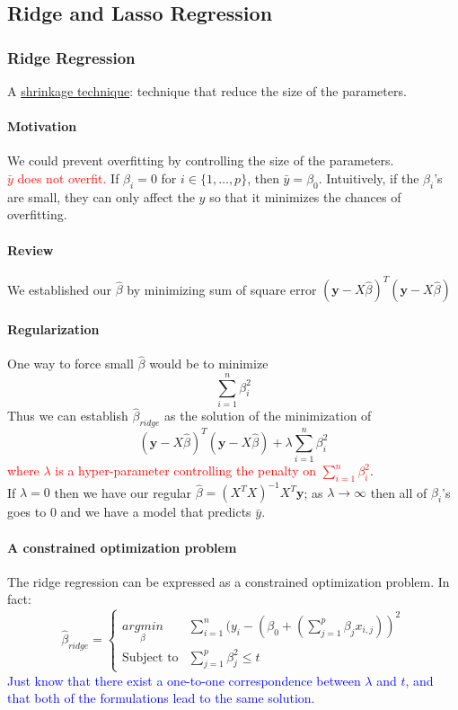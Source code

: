 \documentclass[11pt]{article}
\newcommand{\tb}[1]{\textbf{#1}}
\newcommand{\under}[1]{\underline{#1}}
\newcommand{\vy}[0]{\tb{y}}
\begin{document}
\subsection{Ridge and Lasso Regression}
\subsubsection{Ridge Regression}
A \under{shrinkage technique}: technique that reduce the size of the parameters.
\paragraph{Motivation}
We could prevent overfitting by controlling the size of the parameters.\\
\textcolor{red}{$\bar{y}$ does not overfit.} If $\beta_i = 0$ for $i \in \{1, \hdots, p\}$, then $\bar{y} = \beta_0$. Intuitively, if the $\beta_i$'s are small, they can only affect the $y$ so that it minimizes the chances of overfitting.
\paragraph{Review}
We established our $\hat{\beta}$ by minimizing sum of square error $(\vy - X\hat{\beta})^T(\vy - X\hat{\beta})$
\paragraph{Regularization}
One way to force small $\hat{\beta}$ would be to minimize $$\sum_{i=1}^n \beta_i^2$$
Thus we can establish $\hat{\beta}_{ridge}$ as the solution of the minimization of 
$$(\vy - X\hat{\beta})^T(\vy - X \hat{\beta}) + \lambda \sum_{i=1}^n \beta_i^2$$ 
\textcolor{red}{where $\lambda$ is a hyper-parameter controlling the penalty on $\sum_{i=1}^n \beta_i^2$}. \\
If $\lambda = 0$ then we have our regular $\hat{\beta} = (X^TX)^{-1}X^T\vy$; as $\lambda \rightarrow \infty$ then all of $\beta_i$'s goes to 0 and we have a model that predicts $\bar{y}$.
\paragraph{A constrained optimization problem}
The ridge regression can be expressed as a constrained optimization problem. In fact:
$$\hat{\beta}_{ridge} = \begin{cases}
	\underset{\beta}{argmin} & \sum_{i=1}^n(y_i - (\beta_0 + (\sum_{j=1}^p \beta_j x_{i,j}))^2 \\
	\text{Subject to} & \sum_{j=1}^p \beta_j^2 \leq t
\end{cases} $$
\textcolor{blue}{Just know that there exist a one-to-one correspondence between $\lambda$ and $t$, and that both of the formulations lead to the same solution.}
\end{document}

